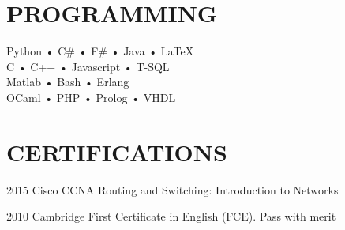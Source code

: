 \documentclass[a4paper]{deedy-resume-openfont}
\begin{document}
\begin{minipage}[t]{0.3\textwidth}
\section{PROGRAMMING}
Python • C\# • F\# • Java • \LaTeX{}\\
C • C++ • Javascript • T-SQL\\ Matlab • Bash • Erlang \\
OCaml • PHP • Prolog • VHDL
\sectionsep%

\section{CERTIFICATIONS} 
\vspace{\topsep} %
\begin{tightemize}
\item[2015]    Cisco CCNA Routing and Switching: Introduction to Networks\\
\item[2010]    Cambridge First Certificate in English (FCE). Pass with merit\\
\end{tightemize}
\sectionsep%

\end{minipage} 
\hfill
\end{document}
